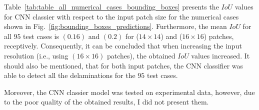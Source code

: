 Table~\ref{tab:table_all_numerical_cases_bounding_boxes} presents the \(IoU\) values for CNN classier with respect to the input patch size for the numerical cases shown in Fig.~\ref{fig:bounding_boxes_predictions}.
Furthermore, the mean \(IoU\) for all \(95\) test cases is \((0.16)\) and \((0.2)\) for (\(14\times14\)) and (\(16\times16\)) patches, receptively.
Consequently, it can be concluded that when increasing the input resolution (i.e., using \((16\times16)\) patches), the obtained \(IoU\) values increased.
It should also be mentioned, that for both input patches, the CNN classifier was able to detect all the delaminations for the \(95\) test cases.

Moreover, the CNN classier model was tested on experimental data, however, due to the poor quality of the obtained results, I did not present them.


